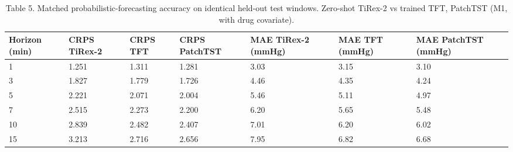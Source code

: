 \begin{table}[t]\centering\footnotesize
\caption{Table 5. Matched probabilistic-forecasting accuracy on identical held-out test windows. Zero-shot TiRex-2 vs trained TFT, PatchTST (M1, with drug covariate).}
\begin{tabular}{lllllll}
\toprule
Horizon (min) & CRPS TiRex-2 & CRPS TFT & CRPS PatchTST & MAE TiRex-2 (mmHg) & MAE TFT (mmHg) & MAE PatchTST (mmHg) \\
\midrule
1 & 1.251 & 1.311 & 1.281 & 3.03 & 3.15 & 3.10 \\
3 & 1.827 & 1.779 & 1.726 & 4.46 & 4.35 & 4.24 \\
5 & 2.221 & 2.071 & 2.004 & 5.46 & 5.11 & 4.97 \\
7 & 2.515 & 2.273 & 2.200 & 6.20 & 5.65 & 5.48 \\
10 & 2.839 & 2.482 & 2.407 & 7.01 & 6.20 & 6.02 \\
15 & 3.213 & 2.716 & 2.656 & 7.95 & 6.82 & 6.68 \\
\bottomrule
\end{tabular}
\end{table}
